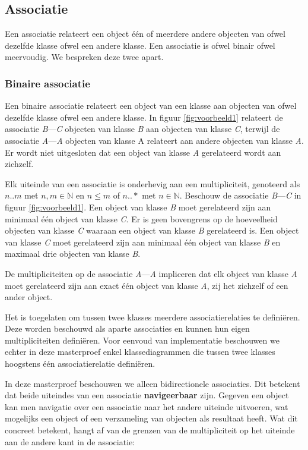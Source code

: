 \subsection{Associatie}

Een associatie relateert een object \'e\'en of meerdere andere objecten van ofwel dezelfde klasse ofwel een andere klasse. Een associatie is ofwel binair ofwel meervoudig. We bespreken deze twee apart.

\subsubsection{Binaire associatie}\label{sec:bin-assoc}

Een binaire associatie relateert een object van een klasse aan objecten van ofwel dezelfde klasse ofwel een andere klasse. In figuur \ref{fig:voorbeeld1} relateert de associatie \textit{B}---\textit{C} objecten van klasse \textit{B} aan objecten van klasse \textit{C}, terwijl de associatie \textit{A}---\textit{A} objecten van klasse A relateert aan andere objecten van klasse \textit{A}. Er wordt niet uitgesloten dat een object van klasse \textit{A} gerelateerd wordt aan zichzelf.

Elk uiteinde van een associatie is onderhevig aan een multipliciteit, genoteerd als $n..m$ met $n,m \in \mathbb{N}$ en $n \leq m$ of $n..*$ met $n \in \mathbb{N}$. Beschouw de associatie \textit{B}---\textit{C} in figuur \ref{fig:voorbeeld1}. Een object van klasse \textit{B} moet gerelateerd zijn aan minimaal \'e\'en object van klasse \textit{C}. Er is geen bovengrens op de hoeveelheid objecten van klasse \textit{C} waaraan een object van klasse \textit{B} gerelateerd is. Een object van klasse \textit{C} moet gerelateerd zijn aan minimaal \'e\'en object van klasse \textit{B} en maximaal drie objecten van klasse \textit{B}.

De multipliciteiten op de associatie \textit{A}---\textit{A} impliceren dat elk object van klasse \textit{A} moet gerelateerd zijn aan exact \'e\'en object van klasse \textit{A}, zij het zichzelf of een ander object.

Het is toegelaten om tussen twee klasses meerdere associatierelaties te defini\"eren. Deze worden beschouwd als aparte associaties en kunnen hun eigen multipliciteiten defini\"eren. Voor eenvoud van implementatie beschouwen we echter in deze masterproef enkel klassediagrammen die tussen twee klasses hoogstens \'e\'en associatierelatie defini\"eren.

In deze masterproef beschouwen we alleen bidirectionele associaties. Dit betekent dat beide uiteindes van een associatie \textbf{navigeerbaar} zijn. Gegeven een object kan men navigatie over een associatie naar het andere uiteinde uitvoeren, wat mogelijks een object of een verzameling van objecten als resultaat heeft. Wat dit concreet betekent, hangt af van de grenzen van de multipliciteit op het uiteinde aan de andere kant in de associatie:

